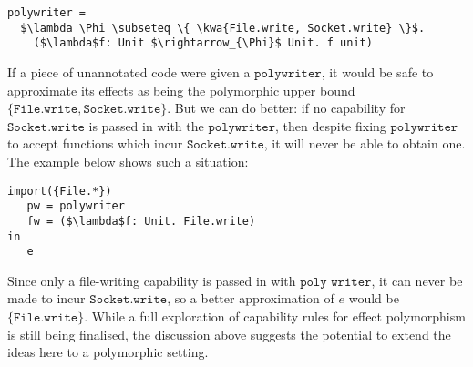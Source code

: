 \documentclass[sigplan,10pt,review]{acmart}\settopmatter{printfolios=true,printccs=false,printacmref=false}
\newcommand{\kwa}[1]{\mathtt{#1}}
\begin{document}
\begin{lstlisting}
polywriter =
  $\lambda \Phi \subseteq \{ \kwa{File.write, Socket.write} \}$.
    ($\lambda$f: Unit $\rightarrow_{\Phi}$ Unit. f unit)
\end{lstlisting}

If a piece of unannotated code were given a $\kwa{polywriter}$, it would be safe to approximate its effects as being the polymorphic upper bound $\{ \kwa{File.write, Socket.write} \}$. But we can do better: if no capability for $\kwa{Socket.write}$ is passed in with the $\kwa{polywriter}$, then despite fixing $\kwa{polywriter}$ to accept functions which incur $\kwa{Socket.write}$, it will never be able to obtain one. The example below shows such a situation:

\begin{lstlisting}
import({File.*}) 
   pw = polywriter
   fw = ($\lambda$f: Unit. File.write)
in
   e
\end{lstlisting}

Since only a file-writing capability is passed in with $\kwa{poly}$ $\kwa{writer}$, it can never be made to incur $\kwa{Socket.write}$, so a better approximation of $e$ would be $\{ \kwa{File.write} \}$.
While a full exploration of capability rules for effect polymorphism is still being finalised, the discussion above suggests the potential to extend the ideas here to a polymorphic setting.
\end{document}
